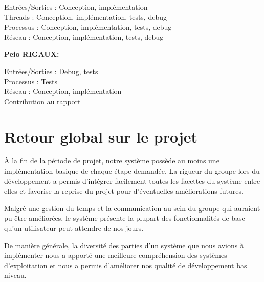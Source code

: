 \documentclass[12pt]{report}
\begin{document}
Entrées/Sorties : Conception, implémentation\\
Threads : Conception, implémentation, tests, debug\\
Processus : Conception, implémentation, tests, debug\\
Réseau : Conception, implémentation, tests, debug
\bigskip

\textbf{Peio RIGAUX:}

Entrées/Sorties : Debug, tests\\
Processus : Tests\\
Réseau : Conception, implémentation\\
Contribution au rapport




\chapter{Retour global sur le projet}

\`A la fin de la période de projet, notre système possède au moins une implémentation basique de chaque étape demandée. La rigueur du groupe lors du développement a permis d'intégrer facilement toutes les facettes du système entre elles et favorise la reprise du projet pour d'éventuelles améliorations futures.
\bigskip

Malgré une gestion du temps et la communication au sein du groupe qui auraient pu être améliorées, le système présente la plupart des fonctionnalités de base qu'un utilisateur peut attendre de nos jours.
\bigskip

De manière générale, la diversité des parties d'un système que nous avions à implémenter nous a apporté une meilleure compréhension des systèmes d'exploitation et nous a permis d'améliorer nos qualité de développement bas niveau.
\end{document}
